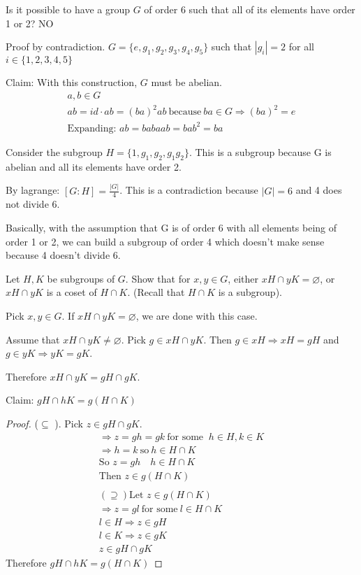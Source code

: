 \documentclass[class=scrartcl, crop=false]{standalone}
\begin{document}
\begin{exercise}
  Is it possible to have a group $G$ of order 6 such that all of its elements have order 1 or 2? NO

  Proof by contradiction.
  $G = \{e, g_1, g_2, g_3, g_4, g_5\}$ such that $|g_i| = 2$ for all $i \in \{1, 2, 3, 4, 5\}$ 

  Claim: With this construction, $G$ must be abelian.
  \begin{gather*}
    a,b \in G \\
    ab = id \cdot ab = (ba)^2ab \ \text{because} \ ba \in G \Rightarrow (ba)^2 = e \\
    \text{Expanding: } ab = babaab = bab^2 = ba
  \end{gather*}

  Consider the subgroup $H = \{1, g_1, g_2, g_1g_2\}$. This is a subgroup because G is abelian and all its elements have order 2.

  By lagrange: $[G:H] = \frac{|G|}{4}$. This is a contradiction because $|G| = 6$ and 4 does not divide 6.

  Basically, with the assumption that G is of order 6 with all elements being of order 1 or 2, we can build a subgroup of order 4 which doesn't make sense because 4 doesn't divide 6.
\end{exercise}

\begin{exercise}
  Let $H,K$ be subgroups of $G$. Show that for $x,y \in G$, either $xH \cap yK = \varnothing$, or $xH \cap yK$ is a coset of $H \cap K$. (Recall that $H \cap K$ is a subgroup).

  Pick $x, y \in G$. If $xH \cap yK = \varnothing$, we are done with this case.

  Assume that $xH \cap yK \neq \varnothing$. Pick $g \in xH \cap yK$. Then $g \in xH \Rightarrow xH = gH$ and $g \in yK \Rightarrow yK = gK$.

  Therefore $xH \cap yK = gH \cap gK$.

  Claim:  $gH \cap hK = g(H \cap K)$
   \begin{proof}
     ($\subseteq$ ). Pick $z \in gH \cap gK$.
     \begin{gather*}
       \Rightarrow z = gh = gk \ \text{for some } \ h\in H, k \in K \\
       \Rightarrow h = k \ \text{so} \ h \in H\cap K \\
       \text{So } z = gh \quad h \in H \cap K \\
       \text{Then } z \in g(H \cap K) \\\\
       (\supseteq)
       \text{Let } z \in g(H \cap K) \\
       \Rightarrow z = gl \ \text{for some} \ l \in H \cap K \\
       l \in H \Rightarrow z \in gH \\
       l \in K \Rightarrow z \in gK \\
       z \in gH \cap gK
     \end{gather*}
     Therefore $gH \cap hK = g(H \cap K)$
  \end{proof}
\end{exercise}
\end{document}
